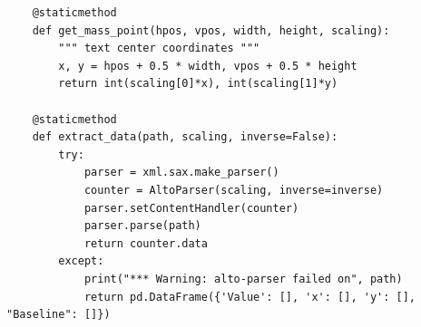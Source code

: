 \begin{lstlisting}
    @staticmethod
    def get_mass_point(hpos, vpos, width, height, scaling):
        """ text center coordinates """
        x, y = hpos + 0.5 * width, vpos + 0.5 * height
        return int(scaling[0]*x), int(scaling[1]*y)

    @staticmethod
    def extract_data(path, scaling, inverse=False):
        try:
            parser = xml.sax.make_parser()
            counter = AltoParser(scaling, inverse=inverse)
            parser.setContentHandler(counter)
            parser.parse(path)
            return counter.data
        except:
            print("*** Warning: alto-parser failed on", path)
            return pd.DataFrame({'Value': [], 'x': [], 'y': [], "Baseline": []})
\end{lstlisting}


